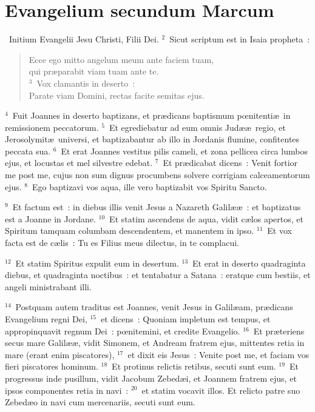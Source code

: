 {\centering \section*{Evangelium secundum Marcum}}\thispagestyle{empty}

~\lettrine[lines=10,image=true,loversize=0.05,lraise=-0.03]{I}{}nitium Evangelii Jesu Christi, Filii Dei.
${}^{2}$~Sicut scriptum est in Isaia propheta~: \begin{flushleft}\begin{verse}Ecce ego mitto angelum meum ante faciem tuam,\\ qui pr\ae parabit viam tuam ante te.\\
${}^{3}$~Vox clamantis in deserto~:\\ Parate viam Domini, rectas facite semitas ejus.\end{verse}\end{flushleft}


${}^{4}$~Fuit Joannes in deserto baptizans, et pr\ae dicans baptismum pœnitenti\ae\ in remissionem peccatorum.
${}^{5}$~Et egrediebatur ad eum omnis Jud\ae \ae\ regio, et Jerosolymit\ae\ universi, et baptizabantur ab illo in Jordanis flumine, confitentes peccata sua.
${}^{6}$~Et erat Joannes vestitus pilis cameli, et zona pellicea circa lumbos ejus, et locustas et mel silvestre edebat.
${}^{7}$~Et pr\ae dicabat dicens~: Venit fortior me post me, cujus non sum dignus procumbens solvere corrigiam calceamentorum ejus.
${}^{8}$~Ego baptizavi vos aqua, ille vero baptizabit vos Spiritu Sancto.


${}^{9}$~Et factum est~: in diebus illis venit Jesus a Nazareth Galil\ae \ae~: et baptizatus est a Joanne in Jordane.
${}^{10}$~Et statim ascendens de aqua, vidit c\ae los apertos, et Spiritum tamquam columbam descendentem, et manentem in ipso.
${}^{11}$~Et vox facta est de c\ae lis~: Tu es Filius meus dilectus, in te complacui.


${}^{12}$~Et statim Spiritus expulit eum in desertum.
${}^{13}$~Et erat in deserto quadraginta diebus, et quadraginta noctibus~: et tentabatur a Satana~: eratque cum bestiis, et angeli ministrabant illi.


${}^{14}$~Postquam autem traditus est Joannes, venit Jesus in Galil\ae am, pr\ae dicans Evangelium regni Dei,
${}^{15}$~et dicens~: Quoniam impletum est tempus, et appropinquavit regnum Dei~: pœnitemini, et credite Evangelio.
${}^{16}$~Et pr\ae teriens secus mare Galil\ae \ae , vidit Simonem, et Andream fratrem ejus, mittentes retia in mare (erant enim piscatores),
${}^{17}$~et dixit eis Jesus~: Venite post me, et faciam vos fieri piscatores hominum.
${}^{18}$~Et protinus relictis retibus, secuti sunt eum.
${}^{19}$~Et progressus inde pusillum, vidit Jacobum Zebed\ae i, et Joannem fratrem ejus, et ipsos componentes retia in navi~:
${}^{20}$~et statim vocavit illos. Et relicto patre suo Zebed\ae o in navi cum mercenariis, secuti sunt eum.


